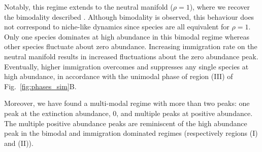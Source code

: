 \documentclass[9pt,twocolumn,twoside,lineno]{pnas-new}
\begin{document}
Notably, this regime extends to the neutral manifold ($\rho = 1$), where we recover the bimodality described \cite{xu2018immigration}.
Although bimodality is observed, this behaviour does not correspond to niche-like dynamics since species are all equivalent for $\rho = 1$.
Only one species dominates at high abundance in this bimodal regime whereas other species fluctuate about zero abundance.
Increasing immigration rate on the neutral manifold results in increased fluctuations about the zero abundance peak.
Eventually, higher immigration overcomes and suppresses any single species at high abundance, in accordance with the unimodal phase of region (III) of Fig.~\ref{fig:phases_sim}B.

Moreover, we have found a multi-modal regime with more than two peaks: one peak at the extinction abundance, 0, and multiple peaks at positive abundance. 
The multiple positive abundance peaks are reminiscent of the high abundance peak in the bimodal and immigration dominated regimes (respectively regions (I) and (II)).
\end{document}
